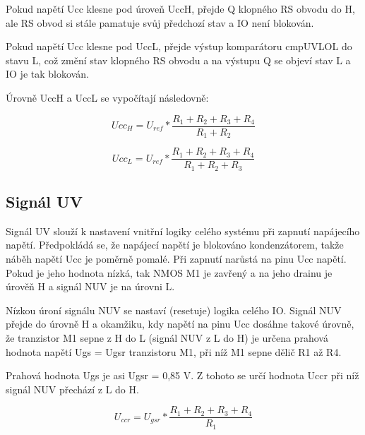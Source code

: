 Pokud napětí Ucc klesne pod úroveň UccH, přejde Q klopného RS obvodu do H, ale RS obvod si stále pamatuje svůj předchozí stav a IO není blokován. 

Pokud napětí Ucc klesne pod UccL, přejde výstup komparátoru cmpUVLOL do stavu L, což změní stav klopného RS obvodu a na výstupu Q se objeví stav L a IO je tak blokován. 

Úrovně UccH a UccL se vypočítají následovně:

\begin{equation}
Ucc_{H} = U_{ref}*\frac{R_{1}+R_{2}+R_{3}+R_{4}}{R_{1}+R_{2}}
\end{equation}

\begin{equation}
Ucc_{L} = U_{ref}*\frac{R_{1}+R_{2}+R_{3}+R_{4}}{R_{1}+R_{2}+R_{3}}
\end{equation}

\subsection{Signál UV}
Signál UV slouží k nastavení vnitřní logiky celého systému při zapnutí napájecího napětí. Předpokládá se, že napájecí napětí je blokováno kondenzátorem, takže náběh napětí Ucc je poměrně pomalé. Při zapnutí narůstá na pinu Ucc napětí. Pokud je jeho hodnota nízká, tak NMOS M1 je zavřený a na jeho drainu je úrověň H a signál NUV je na úrovni L.

Nízkou úroní signálu NUV se nastaví (resetuje) logika celého IO. Signál NUV přejde do úrovně H a okamžiku, kdy napětí na pinu Ucc dosáhne takové úrovně, že tranzistor M1 sepne z H do L (signál NUV z L do H) je určena prahová hodnota napětí Ugs = Ugsr tranzistoru M1, při níž M1 sepne dělič R1 až R4.

Prahová hodnota Ugs je asi Ugsr = 0,85 V. Z tohoto se určí hodnota Uccr při níž signál NUV přechází z L do H.

\begin{equation}
U_{ccr} = U_{gsr}*\frac{R_{1}+R_{2}+R_{3}+R_{4}}{R_{1}}
\end{equation}
